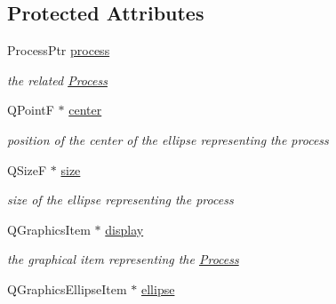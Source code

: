 \subsection*{Protected Attributes}
\begin{DoxyCompactItemize}
\item 
\hypertarget{classGProcess_adb2d4b43a105c00b5be1f5bc405a3f43}{Process\+Ptr \hyperlink{classGProcess_adb2d4b43a105c00b5be1f5bc405a3f43}{process}}\label{classGProcess_adb2d4b43a105c00b5be1f5bc405a3f43}

\begin{DoxyCompactList}\small\item\em the related \hyperlink{classProcess}{Process} \end{DoxyCompactList}\item 
\hypertarget{classGProcess_adfaaca476a8b0f8cdee231e1ebd80b78}{Q\+Point\+F $\ast$ \hyperlink{classGProcess_adfaaca476a8b0f8cdee231e1ebd80b78}{center}}\label{classGProcess_adfaaca476a8b0f8cdee231e1ebd80b78}

\begin{DoxyCompactList}\small\item\em position of the center of the ellipse representing the process \end{DoxyCompactList}\item 
\hypertarget{classGProcess_ab28a1e140b3206418b23593588d9777f}{Q\+Size\+F $\ast$ \hyperlink{classGProcess_ab28a1e140b3206418b23593588d9777f}{size}}\label{classGProcess_ab28a1e140b3206418b23593588d9777f}

\begin{DoxyCompactList}\small\item\em size of the ellipse representing the process \end{DoxyCompactList}\item 
\hypertarget{classGProcess_afcb6a6765219d5ca69f23b89a147a7db}{Q\+Graphics\+Item $\ast$ \hyperlink{classGProcess_afcb6a6765219d5ca69f23b89a147a7db}{display}}\label{classGProcess_afcb6a6765219d5ca69f23b89a147a7db}

\begin{DoxyCompactList}\small\item\em the graphical item representing the \hyperlink{classProcess}{Process} \end{DoxyCompactList}\item 
\hypertarget{classGProcess_ac0770d84d26f835cd409cb1bbd5a2408}{Q\+Graphics\+Ellipse\+Item $\ast$ \hyperlink{classGProcess_ac0770d84d26f835cd409cb1bbd5a2408}{ellipse}}\label{classGProcess_ac0770d84d26f835cd409cb1bbd5a2408}


\end{DoxyCompactItemize}
